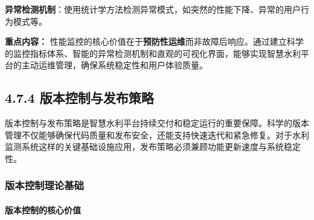\textbf{异常检测机制}：使用统计学方法检测异常模式，如突然的性能下降、异常的用户行为模式等。

\begin{Shaded}
\begin{Highlighting}[]
  \OperatorTok{,}
    \OperatorTok{=} 
    \OperatorTok{=} \OperatorTok{,}
    
    \OperatorTok{\textgreater{}} \NormalTok{) \{}
      \NormalTok{(}\OperatorTok{,}
\NormalTok{    \}}
\NormalTok{  \}}
\NormalTok{\}}
\end{Highlighting}
\end{Shaded}

\textbf{重点内容：} 性能监控的核心价值在于\textbf{预防性运维}而非故障后响应。通过建立科学的监控指标体系、智能的异常检测机制和直观的可视化界面，能够实现智慧水利平台的主动运维管理，确保系统稳定性和用户体验质量。

\subsection{4.7.4 版本控制与发布策略}\label{ux7248ux672cux63a7ux5236ux4e0eux53d1ux5e03ux7b56ux7565}

版本控制与发布策略是智慧水利平台持续交付和稳定运行的重要保障。科学的版本管理不仅能够确保代码质量和发布安全，还能支持快速迭代和紧急修复。对于水利监测系统这样的关键基础设施应用，发布策略必须兼顾功能更新速度与系统稳定性。

\subsubsection{版本控制理论基础}\label{ux7248ux672cux63a7ux5236ux7406ux8bbaux57faux7840}

\paragraph{版本控制的核心价值}\label{ux7248ux672cux63a7ux5236ux7684ux6838ux5fc3ux4ef7ux503c}


